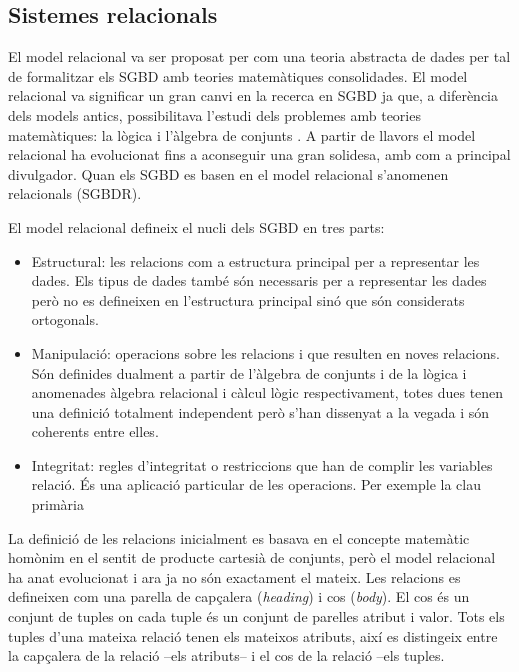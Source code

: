  


\subsection{Sistemes relacionals}
\label{sec:estat:sgbdr}

El model relacional va ser proposat per \textcite{codd70} com una
teoria abstracta de dades per tal de formalitzar els SGBD amb teories
matemàtiques consolidades.  El model relacional va significar un gran
canvi en la recerca en SGBD ja que, a diferència dels models antics,
possibilitava l'estudi dels problemes amb teories matemàtiques: la
lògica i l'àlgebra de
conjunts \parencite{atzeni13:relational_model_dead}.  A partir de
llavors el model relacional ha evolucionat fins a aconseguir una gran
solidesa, amb \textcite{date04:introduction8,date06,date:dictionary} com
a principal divulgador.  Quan els SGBD es basen en el model relacional
s'anomenen relacionals (SGBDR).



El model relacional defineix el nucli dels SGBD en tres parts:
\begin{itemize}
\item Estructural: les relacions com a estructura principal per a
  representar les dades. Els tipus de dades també són necessaris per a
  representar les dades però no es defineixen en l'estructura
  principal sinó que són considerats ortogonals. 

\item Manipulació: operacions sobre les relacions i que resulten en
  noves relacions. Són definides dualment a partir de l'àlgebra de
  conjunts i de la lògica i anomenades àlgebra relacional i càlcul
  lògic respectivament, totes dues tenen una definició totalment
  independent però s'han dissenyat a la vegada i són coherents entre
  elles.

\item Integritat: regles d'integritat o restriccions que han de
  complir les variables relació. És una aplicació particular de les
  operacions. Per exemple la clau primària 

\end{itemize}


La definició de les relacions inicialment es basava en el concepte
matemàtic homònim en el sentit de producte cartesià de conjunts, però
el model relacional ha anat evolucionat i ara ja no són exactament el
mateix.  Les relacions es defineixen com una parella de capçalera
(\emph{heading}) i cos (\emph{body}). El cos és un conjunt de tuples
on cada tuple és un conjunt de parelles atribut i valor. Tots els
tuples d'una mateixa relació tenen els mateixos atributs, així es
distingeix entre la capçalera de la relació --els atributs-- i el cos
de la relació --els tuples.

